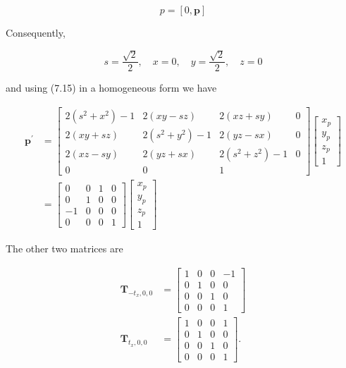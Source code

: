 $$
p=[0, \mathbf{p}]
$$

Consequently,

$$
s=\frac{\sqrt{2}}{2}, \quad x=0, \quad y=\frac{\sqrt{2}}{2}, \quad z=0
$$

and using (7.15) in a homogeneous form we have

$$
\begin{aligned}
\mathbf{p}^{\prime} & =\left[\begin{array}{cccc}
2\left(s^{2}+x^{2}\right)-1 & 2(x y-s z) & 2(x z+s y) & 0 \\
2(x y+s z) & 2\left(s^{2}+y^{2}\right)-1 & 2(y z-s x) & 0 \\
2(x z-s y) & 2(y z+s x) & 2\left(s^{2}+z^{2}\right)-1 & 0 \\
0 & 0 & 1
\end{array}\right]\left[\begin{array}{c}
x_{p} \\
y_{p} \\
z_{p} \\
1
\end{array}\right] \\
& =\left[\begin{array}{cccc}
0 & 0 & 1 & 0 \\
0 & 1 & 0 & 0 \\
-1 & 0 & 0 & 0 \\
0 & 0 & 0 & 1
\end{array}\right]\left[\begin{array}{c}
x_{p} \\
y_{p} \\
z_{p} \\
1
\end{array}\right]
\end{aligned}
$$

The other two matrices are

$$
\begin{aligned}
\mathbf{T}_{-t_{x}, 0,0} & =\left[\begin{array}{cccc}
1 & 0 & 0 & -1 \\
0 & 1 & 0 & 0 \\
0 & 0 & 1 & 0 \\
0 & 0 & 0 & 1
\end{array}\right] \\
\mathbf{T}_{t_{x}, 0,0} & =\left[\begin{array}{llll}
1 & 0 & 0 & 1 \\
0 & 1 & 0 & 0 \\
0 & 0 & 1 & 0 \\
0 & 0 & 0 & 1
\end{array}\right] .
\end{aligned}
$$

